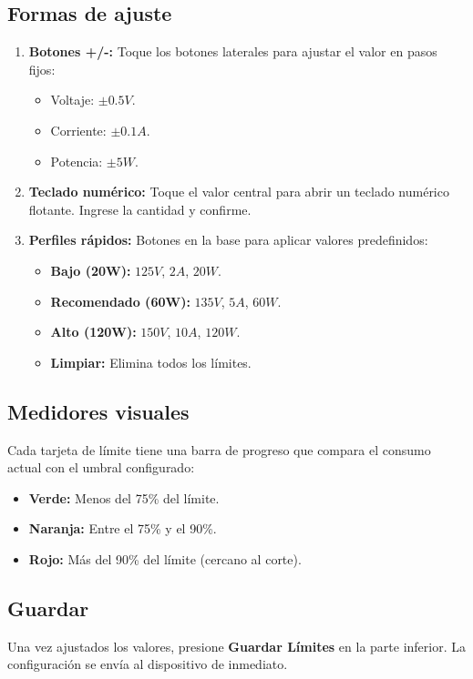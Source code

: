 \documentclass[10pt,a4paper]{article}
\begin{document}
\subsection{Formas de ajuste}
\begin{enumerate}
    \item \textbf{Botones +/-:} Toque los botones laterales para ajustar el valor en pasos fijos:
    \begin{itemize}
        \item Voltaje: $\pm 0.5V$.
        \item Corriente: $\pm 0.1A$.
        \item Potencia: $\pm 5W$.
    \end{itemize}
    \item \textbf{Teclado numérico:} Toque el valor central para abrir un teclado numérico flotante. Ingrese la cantidad y confirme.
    \item \textbf{Perfiles rápidos:} Botones en la base para aplicar valores predefinidos:
    \begin{itemize}
        \item \textbf{Bajo (20W):} $125V$, $2A$, $20W$.
        \item \textbf{Recomendado (60W):} $135V$, $5A$, $60W$.
        \item \textbf{Alto (120W):} $150V$, $10A$, $120W$.
        \item \textbf{Limpiar:} Elimina todos los límites.
    \end{itemize}
\end{enumerate}

\subsection{Medidores visuales}
Cada tarjeta de límite tiene una barra de progreso que compara el consumo actual con el umbral configurado:
\begin{itemize}
    \item \textbf{Verde:} Menos del 75\% del límite.
    \item \textbf{Naranja:} Entre el 75\% y el 90\%.
    \item \textbf{Rojo:} Más del 90\% del límite (cercano al corte).
\end{itemize}

\subsection{Guardar}
Una vez ajustados los valores, presione \textbf{Guardar Límites} en la parte inferior. La configuración se envía al dispositivo de inmediato.
\end{document}
